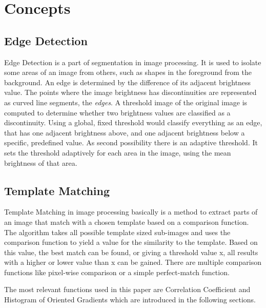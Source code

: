 \section{Concepts}
\label{sec_concepts}

\subsection{Edge Detection}
Edge Detection is a part of segmentation in image processing.
It is used to isolate some areas of an image from others, such as shapes in the foreground from the background.
An edge is determined by the difference of its adjacent brightness value.
The points where the image brightness has discontinuities are represented as curved line segments, the \textit{edges}.
A threshold image of the original image is computed to determine whether two brightness values are classified as a discontinuity.
Using a global, fixed threshold would classify everything as an edge, that has one adjacent brightness above, and one adjacent brightness below a specific, predefined value.
As second possibility there is an adaptive threshold.
It sets the threshold adaptively for each area in the image, using the mean brightness of that area.


\subsection{Template Matching}
Template Matching in image processing basically is a method to extract parts of an image that match with a chosen template based on a comparison function.
The algorithm takes all possible template sized sub-images and uses the comparison function to yield a value for the similarity to the template.
Based on this value, the best match can be found, or giving a threshold value x, all results with a higher or lower value than x can be gained.
There are multiple comparison functions like pixel-wise comparison or a simple perfect-match function.

The most relevant functions used in this paper are Correlation Coefficient and Histogram of Oriented Gradients which are introduced in the following sections.

